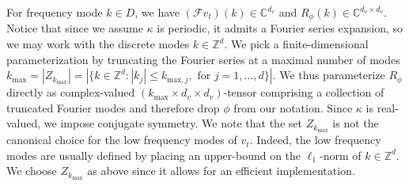 \documentclass{article} %
\newcommand{\C}{\mathbb{C}}
\newcommand{\cG}{\mathcal{F}}
\begin{document}
For frequency mode \(k \in D\), we have $(\cG v_t)(k) \in \C^{d_v}$ and $R_\phi(k) \in \C^{d_v \times d_v}$. Notice that since we assume $\kappa$ is periodic, it admits a Fourier series expansion, so we may work with the discrete modes $k \in \mathbb{Z}^d$. We pick a finite-dimensional parameterization by truncating the Fourier series at a maximal number of modes 
\(k_{\text{max}} = |Z_{k_{\text{max}}}| = |\{k \in \mathbb{Z}^d : |k_j| \leq k_{\text{max},j}, \text{ for } j=1,\dots,d\}|.\)
We thus parameterize $R_\phi$ directly as complex-valued $(k_{\text{max}} \times d_v \times d_v)$-tensor comprising a collection of truncated Fourier modes and therefore drop $\phi$ from our notation. Since $\kappa$ is real-valued, we impose conjugate symmetry. 
We note that the set $Z_{k_{\text{max}}}$ is not the canonical choice for the low frequency modes of $v_t$. Indeed, the low frequency modes are usually defined by placing an upper-bound on the $\ell_1$-norm of $k \in \mathbb{Z}^d$. We choose $Z_{k_{\text{max}}}$ as above since it allows for an efficient implementation. 

\end{document}
